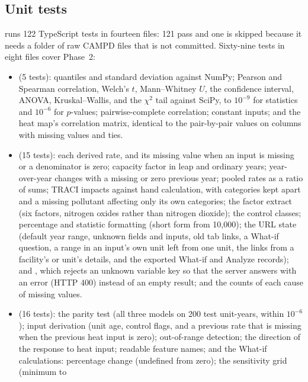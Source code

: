 \documentclass[11pt,a4paper]{article}
\begin{document}
\subsection{Unit tests}

 runs 122 TypeScript tests in fourteen files: 121 pass and one is skipped because it
needs a folder of raw CAMPD files that is not committed. Sixty-nine tests in eight files cover
Phase~2:
\begin{itemize}
  \item {} (5 tests): quantiles and standard deviation against NumPy; Pearson
        and Spearman correlation, Welch's $t$, Mann--Whitney $U$, the confidence interval,
        ANOVA, Kruskal--Wallis, and the $\chi^2$ tail against SciPy, to $10^{-9}$ for statistics
        and $10^{-6}$ for $p$-values; pairwise-complete correlation; constant inputs; and the
        heat map's correlation matrix, identical to the pair-by-pair values on columns with
        missing values and ties.
  \item {} (15 tests): each derived rate, and its missing value when an input
        is missing or a denominator is zero; capacity factor in leap and ordinary years;
        year-over-year changes with a missing or zero previous year; pooled rates as a ratio of
        sums; TRACI impacts against hand calculation, with categories kept apart and a missing
        pollutant affecting only its own categories; the factor extract (six factors, nitrogen
        oxides rather than nitrogen dioxide); the control classes; percentage and statistic
        formatting (short form from 10{,}000); the URL state (default year range, unknown fields
        and inputs, old tab links, a What-if question, a range in an input's own unit left from
        one unit, the links from a facility's or unit's details, and the exported What-if and
        Analyze records); and , which
        rejects an unknown variable key so that the server answers with an error (HTTP 400)
        instead of an empty result; and the counts of each cause of missing values.
  \item {} (16 tests): the parity test (all three models on 200 test
        unit-years, within $10^{-6}$); input derivation (unit age, control flags, and a previous
        rate that is missing when the previous heat input is zero); out-of-range detection; the
        direction of the response to heat input; readable feature names; and the What-if
        calculations: percentage change (undefined from zero); the sensitivity grid (minimum to

\end{itemize}
\end{document}
